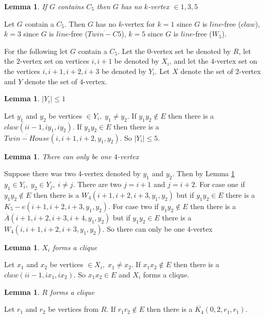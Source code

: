 \documentclass[12pt]{article}
\newtheorem{Lemma}[Theorem]{Lemma}
\begin{document}
\begin{Lemma}\label{lem:c5-kvertex}
If $G$ contains $C_5$ then $G$ has no $k$-vertex $\in {1,3,5}$
\end{Lemma}
 Let $G$ contain a $C_5$. Then $G$ has no $k$-vertex for $k = 1$ since $G$ is $line$-free ($claw$), $k = 3$ since $G$ is $line$-free ($\overline{Twin-C5}$), $k = 5$ since $G$ is $line$-free ($W_5$). 

For the following let $G$ contain a $C_5$. Let the $0$-vertex set be denoted by $R$, let the $2$-vertex set on vertices $i, i+1$ be denoted by $X_i$, and let the $4$-vertex set on the vertices $i, i+1, i+2, i+3$ be denoted by $Y_i$. Let $X$ denote the set of $2$-vertex and $Y$ denote the set of $4$-vertex.

\begin{Lemma}\label{lem:c5-4vertex-bounded}
$|Y_i| \leq 1$
\end{Lemma}
 Let $y_1$ and $y_2$ be vertices $\in Y_i,\; y_1 \neq y_2$. If $y_1y_2 \not \in E$ then there is a $claw (ii-1, iy_1,iy_2)$. If $y_1y_2 \in E$ then there is a $\overline{Twin-House} (i,i+1,i+2,y_1,y_2)$. So $|Y_i| \leq 5$.

\begin{Lemma}\label{lem:one-4vertex}
There can only be one $4$-vertex
\end{Lemma}
 Suppose there was two $4$-vertex denoted by $y_1$ and $y_2$. Then by Lemma \ref{lem:c5-4vertex-bounded} $y_1 \in Y_i,\; y_2 \in Y_j,\; i \neq j$. There are two $j=i+1$ and $j=i+2$. For case one if $y_1y_2 \not \in E$ then there is a $W_4 (i+1,i+2,i+3,y_1,y_2)$ but if $y_1y_2 \in E$ there is a $K_5 - e (i+1,i+2,i+3,y_1,y_2)$. For case two if $y_1y_2 \not \in E$ then there is a $\overline{A} (i+1,i+2,i+3,i+4,y_1,y_2)$ but if $y_1y_2 \in E$ there is a $W_4(i,i+1,i+2,i+3,y_1,y_2)$. So there can only be one $4$-vertex

\begin{Lemma}\label{lem:xi-clique}
$X_i$ forms a clique
\end{Lemma}
 Let $x_1$ and $x_2$ be vertices $\in X_i,\; x_1 \neq x_2$. If $x_1x_2 \not \in E$ then there is a $claw (ii-1, ix_1, ix_2)$. So $x_1x_2 \in E$ and $X_i$ forms a clique.

\begin{Lemma}\label{lem:r-clique}
$R$ forms a clique
\end{Lemma}
 Let $r_1$ and $r_2$ be vertices from $R$. If $r_1r_2 \not \in E$ then there is a $\overline{K_4} (0, 2, r_1, r_1)$.
\end{document}
